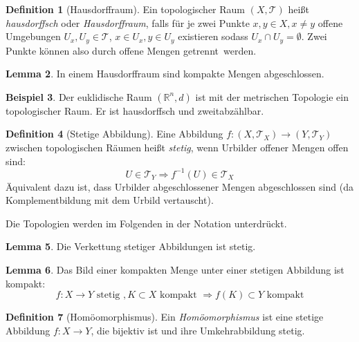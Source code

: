 \documentclass[a4paper]{scrreprt}
\numberwithin{equation}{chapter}
\newcommand{\R}{\mathbb{R}}
\theoremstyle{definition}
\newtheorem{defn}{Definition}[section]
\newtheorem{lemma}[defn]{Lemma}
\newtheorem{bsp}[defn]{Beispiel}
\begin{document}
		\begin{defn}[Hausdorffraum]
			Ein topologischer Raum $(X,\mathcal{T})$ heißt \emph{hausdorffsch} oder \emph{Hausdorffraum}, falls für je zwei Punkte $x,y\in X, x\neq y$ offene Umgebungen ${U_x,U_y\in\mathcal{T}}$, ${x\in U_x}, {y\in U_y}$ existieren sodass $U_x\cap U_y=\emptyset$. Zwei Punkte können also durch offene Mengen \glqq getrennt\grqq\ werden.
		\end{defn}
		\begin{lemma}
			In einem Hausdorffraum sind kompakte Mengen abgeschlossen.
		\end{lemma}
		\begin{bsp}
			Der euklidische Raum $(\R^n,d)$ ist mit der metrischen Topologie ein topologischer Raum. Er ist hausdorffsch und zweitabzählbar.
		\end{bsp}
		\begin{defn}[Stetige Abbildung]
			Eine Abbildung $f\colon (X,\mathcal{T}_X)\rightarrow (Y,\mathcal{T}_Y)$ zwischen topologischen Räumen heißt \emph{stetig}, wenn Urbilder offener Mengen offen sind:
			\begin{equation*}
				U\in\mathcal{T}_Y \Rightarrow f^{-1}(U)\in\mathcal{T}_X
			\end{equation*}
			Äquivalent dazu ist, dass Urbilder abgeschlossener Mengen abgeschlossen sind (da Komplementbildung mit dem Urbild vertauscht).
		\end{defn}
		Die Topologien werden im Folgenden in der Notation unterdrückt.
		\begin{lemma}
			Die Verkettung stetiger Abbildungen ist stetig.
		\end{lemma}
		\begin{lemma}
			Das Bild einer kompakten Menge unter einer stetigen Abbildung ist kompakt:
			\begin{equation*}
				f\colon X\rightarrow Y \text{ stetig }, K\subset X \text{ kompakt }\Rightarrow f(K)\subset Y \text{ kompakt}
			\end{equation*}
		\end{lemma}
		\begin{defn}[Homöomorphismus]
			Ein \emph{Homöomorphismus} ist eine stetige Abbildung $f\colon X\rightarrow Y$, die bijektiv ist und ihre Umkehrabbildung stetig.
		\end{defn}
\end{document}

